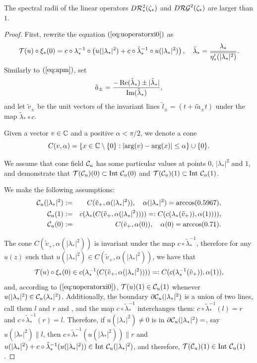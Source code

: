 \begin{prop}\label{prop:unstable_dir} 
The spectral radii of the linear operators $D \cR_*^2(\zeta_*)$ and $D \cRG^2(\zeta_*)$ are larger than $1$. 
\end{prop} 
\begin{proof}
First, rewrite the equation $(\ref{eq:uoperatorxi0})$ as 
$$\cT(u)\circ \xi_*(0)=c \circ \lambda_*^{-1} \circ \left(u(|\lambda_*|^2) + c \circ \tilde{\lambda}_*^{-1} \circ  u(|\lambda_*|^2) \right), \quad \tilde{\lambda}_*= {\lambda_* \over \overline{\eta'_*(|\lambda_*|^2)}}.$$
Similarly to $(\ref{eq:apm})$, set  
$$\tilde{a}_\pm={ -\Re(\tilde{\lambda}_*) \pm |\tilde{\lambda}_*| \over \Im(\tilde{\lambda}_*)},$$
and let $\tilde{v}_\pm$ be the unit vectors of the invariant lines $\tilde{l}_\pm=(t+i \tilde{a}_\pm t)$ under the map $\tilde{\lambda}_* \circ c$.

Given a vector $v \in \fC$ and a positive $\alpha< \pi/2$, we denote a cone
$$C(v,\alpha)=\{x \in \fC \setminus \{0\}: |\arg(v)-\arg(x)| \le \alpha \} \cup \{0\}.$$

\medskip

 We assume that cone field $\cC_u$ has some particular values at points $0$, $|\lambda_*|^2$ and $1$, and demonstrate that $\cT(\cC_u)(0) \subset {\rm Int} \ \cC_u(0)$ and $\cT(\cC_u)(1) \subset {\rm Int} \ \cC_u(1)$.


We make the following assumptions:
\begin{eqnarray}
\label{eq:conel2} \cC_u(|\lambda_*|^2)&:=&C(\tilde{v}_+,\alpha(|\lambda_*|^2)), \quad \alpha(|\lambda_*|^2)=\arccos(0.5967), \\
\label{eq:conel1} \cC_u(1)&:=&c(\lambda_*(C(\tilde{v}_+,\alpha(|\lambda_*|^2))))=:C(c(\lambda_*(\tilde{v}_+)),\alpha(1)))), \\
\label{eq:cone0} \cC_u(0)&:=&C(\tilde{v}_+,\alpha(0)), \quad \alpha(0)=\arccos(0.71).
\end{eqnarray}



The cone $C(\tilde{v}_+,\alpha(|\lambda_*|^2))$ is invariant under the map $c \circ \tilde{\lambda}_*^{-1}$, therefore for any $u(z)$ such that $u(|\lambda_*|^2) \in C(\tilde{v}_+,\alpha(|\lambda_*|^2))$, we have that  
$$\cT(u)\circ \xi_*(0) \in c(\lambda_*^{-1}(C(\tilde{v}_+,\alpha(|\lambda_*|^2))))=: C(c(\lambda_*^{-1}(\tilde{v}_+)),\alpha(1)),$$  
and, according to $(\ref{eq:uoperatorxi0})$, $\cT(u)(1) \in  \cC_u(1)$ whenever $u(|\lambda_*|^2) \in \cC_u(\lambda_*|^2)$. Additionally, the boundary $\partial \cC_u(|\lambda_*|^2)$ is a union of two lines, call them $l$ and $r$ and , and  the map $c \circ \tilde{\lambda}_*^{-1}$ interchanges them: $c \circ \tilde{\lambda}_*^{-1}(l)=r$ and   $c \circ \tilde{\lambda}_*^{-1}(r)=l$. Therefore, if $u(|\lambda_*|^2) \ne 0$ is in $\partial \cC_u(|\lambda_*|^2)=$, say $u(|\lambda_*|^2)\parallel l$, then $c \circ \tilde{\lambda}_*^{-1}(u(|\lambda_*|^2)) \parallel r$ and  $u(|\lambda_*|^2)+ c \circ \tilde{\lambda}_*^{-1}(u(|\lambda_*|^2)) \in {\rm Int} \ \cC_u(|\lambda_*|^2)$, and therefore, $\cT(\cC_u)(1) \in  {\rm Int} \ \cC_u(1)$.



\end{proof}
